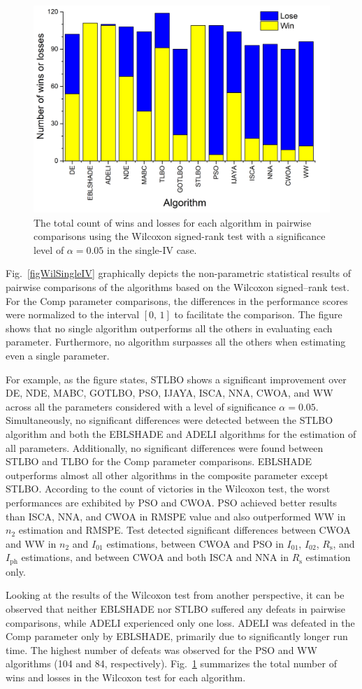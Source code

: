 \documentclass[a4paper,fleqn]{cas-sc}
\begin{document}
\begin{figure}[]
	\centering
		\includegraphics[width=0.45\columnwidth]{Fig6}
	  \caption{The total count of wins and losses for each algorithm in pairwise comparisons using the
               Wilcoxon signed-rank test with a significance level of $\alpha = 0.05$ in the single-IV case.}\label{figWilTotSingleIV}
\end{figure}

Fig.~\ref{figWilSingleIV} graphically depicts
the non-parametric statistical results of pairwise comparisons of the algorithms
based on the Wilcoxon signed--rank test.
For the Comp parameter comparisons, the differences in the performance scores
were normalized to the interval $[0,\, 1]$ to facilitate the comparison.
The figure shows that no single algorithm outperforms all the others in evaluating each parameter.
Furthermore, no algorithm surpasses all the others when estimating even a single parameter.


For example, as the figure states, STLBO shows a significant improvement over
DE, NDE, MABC, GOTLBO, PSO, IJAYA, ISCA, NNA, CWOA, and WW across all the parameters
considered with a level of significance $\alpha = 0.05$.
Simultaneously, no significant differences were detected between the STLBO algorithm
and both the EBLSHADE and ADELI algorithms for the estimation of all parameters.
Additionally, no significant differences were found between STLBO and TLBO for the Comp parameter comparisons.
EBLSHADE outperforms almost all other algorithms in the composite parameter except STLBO.
According to the count of victories in the Wilcoxon test,
the worst performances are exhibited by PSO and CWOA.
PSO achieved better results than ISCA, NNA, and CWOA in RMSPE value and
also outperformed WW in $n_2$ estimation and RMSPE.
Test detected significant differences between CWOA and WW in $n_2$ and $I_{01}$ estimations,
between CWOA and PSO in $I_{01}$, $I_{02}$, $R_\mathrm{s}$, and $I_\mathrm{ph}$ estimations,
and between CWOA and both ISCA and NNA in $R_\mathrm{s}$  estimation only.

Looking at the results of the Wilcoxon test from another perspective,
it can be observed that neither EBLSHADE nor STLBO suffered any defeats in pairwise comparisons,
while ADELI experienced only one loss.
ADELI was defeated in the Comp parameter only by  EBLSHADE,
primarily due to significantly longer run time.
The highest number of defeats was observed for the PSO and WW algorithms
(104 and 84, respectively).
Fig.~\ref{figWilTotSingleIV} summarizes the total number of wins and losses in the Wilcoxon test for each algorithm.
\end{document}
